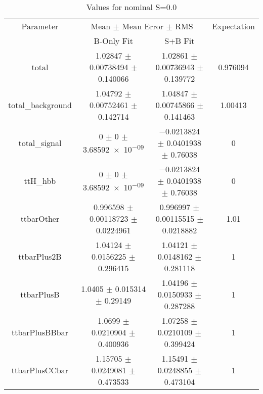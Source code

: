 \begin{table}
\centering
\caption{Values for nominal S=0.0}
\begin{tabular}{cccc}
\toprule
Parameter & \multicolumn{2}{c}{Mean $\pm$ Mean Error $\pm$ RMS} & Expectation\\
 & B-Only Fit & S+B Fit & \\
\midrule
total & \num{1.02847} $\pm$ \num{0.00738494} $\pm$ \num{0.140066} & \num{1.02861} $\pm$ \num{0.00736943} $\pm$ \num{0.139772} & \num{0.976094}\\
total\_background & \num{1.04792} $\pm$ \num{0.00752461} $\pm$ \num{0.142714} & \num{1.04847} $\pm$ \num{0.00745866} $\pm$ \num{0.141463} & \num{1.00413}\\
total\_signal & \num{0} $\pm$ \num{0} $\pm$ \num{3.68592e-09} & \num{-0.0213824} $\pm$ \num{0.0401938} $\pm$ \num{0.76038} & \num{0}\\
ttH\_hbb & \num{0} $\pm$ \num{0} $\pm$ \num{3.68592e-09} & \num{-0.0213824} $\pm$ \num{0.0401938} $\pm$ \num{0.76038} & \num{0}\\
ttbarOther & \num{0.996598} $\pm$ \num{0.00118723} $\pm$ \num{0.0224961} & \num{0.996997} $\pm$ \num{0.00115515} $\pm$ \num{0.0218882} & \num{1.01}\\
ttbarPlus2B & \num{1.04124} $\pm$ \num{0.0156225} $\pm$ \num{0.296415} & \num{1.04121} $\pm$ \num{0.0148162} $\pm$ \num{0.281118} & \num{1}\\
ttbarPlusB & \num{1.0405} $\pm$ \num{0.015314} $\pm$ \num{0.29149} & \num{1.04196} $\pm$ \num{0.0150933} $\pm$ \num{0.287288} & \num{1}\\
ttbarPlusBBbar & \num{1.0699} $\pm$ \num{0.0210904} $\pm$ \num{0.400936} & \num{1.07258} $\pm$ \num{0.0210109} $\pm$ \num{0.399424} & \num{1}\\
ttbarPlusCCbar & \num{1.15705} $\pm$ \num{0.0249081} $\pm$ \num{0.473533} & \num{1.15491} $\pm$ \num{0.0248855} $\pm$ \num{0.473104} & \num{1}\\
\bottomrule
\end{tabular}
\end{table}